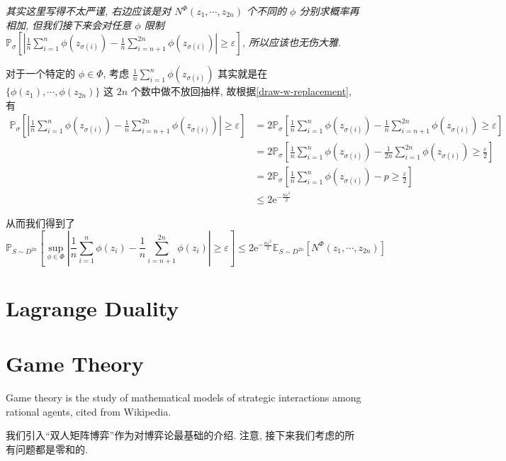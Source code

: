 \documentclass[8pt]{article}
\theoremstyle{compact}
\def\le{\leqslant}
\def\ge{\geqslant}
\def\e{\mathrm{e}}
\begin{document}
\textit{其实这里写得不太严谨, 右边应该是对 $N^{\Phi}(z_1, \cdots, z_{2n})$ 个不同的 $\phi$ 分别求概率再相加, 但我们接下来会对任意 $\phi$ 限制 $\mathbb P_{\sigma}\left[\left|\frac1n\sum\limits_{i=1}^{n}\phi(z_{\sigma(i)}) - \frac1n\sum\limits_{i=n+1}^{2n}\phi(z_{\sigma(i)})\right| \ge \varepsilon\right]$, 所以应该也无伤大雅.}

对于一个特定的 $\phi \in \Phi$, 考虑 $\frac1n\sum\limits_{i=1}^{n}\phi(z_{\sigma(i)})$ 其实就是在 $\{\phi(z_1), \cdots, \phi(z_{2n})\}$ 这 $2n$ 个数中做不放回抽样, 故根据\cref{draw-w-replacement}, 有 \begin{equation*}
	\begin{split}
		\mathbb P_{\sigma}\left[\left|\frac1n\sum\limits_{i=1}^{n}\phi(z_{\sigma(i)}) - \frac1n\sum\limits_{i=n+1}^{2n}\phi(z_{\sigma(i)})\right| \ge \varepsilon\right]
		&=2\mathbb P_{\sigma}\left[\frac1n\sum\limits_{i=1}^{n}\phi(z_{\sigma(i)}) - \frac1n\sum\limits_{i=n+1}^{2n}\phi(z_{\sigma(i)}) \ge \varepsilon\right]\\
		&=2\mathbb P_{\sigma}\left[\frac1n\sum\limits_{i=1}^{n}\phi(z_{\sigma(i)}) - \frac1{2n}\sum\limits_{i=1}^{2n}\phi(z_{\sigma(i)}) \ge \frac{\varepsilon}{2}\right]\\
		&=2\mathbb P_{\sigma}\left[\frac1n\sum\limits_{i=1}^{n}\phi(z_{\sigma(i)}) - p \ge \frac{\varepsilon}{2}\right]\\
		&\le 2\e^{-\frac{n\varepsilon^2}{2}}
	\end{split}
\end{equation*}

从而我们得到了 $$\mathbb P_{S \sim D^{2n}}\left[\sup_{\phi \in \Phi}\left|\frac1n\sum_{i=1}^{n}\phi(z_i) - \frac1n\sum_{i=n+1}^{2n}\phi(z_i)\right| \ge \varepsilon\right] \le 2\e^{-\frac{n\varepsilon^2}{2}}\mathbb E_{S \sim D^{2n}}\left[N^{\Phi}(z_1, \cdots, z_{2n})\right]$$


\newpage
\section{Lagrange Duality}

\newpage
\section{Game Theory}

Game theory is the study of mathematical models of strategic interactions among rational agents, cited from Wikipedia.

我们引入“双人矩阵博弈”作为对博弈论最基础的介绍. 注意, 接下来我们考虑的所有问题都是零和的.
\end{document}
